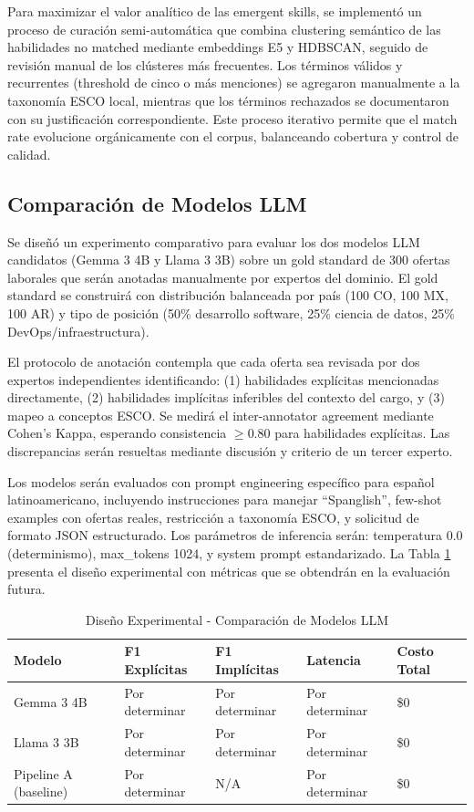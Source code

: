 Para maximizar el valor analítico de las emergent skills, se implementó un proceso de curación semi-automática que combina clustering semántico de las habilidades no matched mediante embeddings E5 y HDBSCAN, seguido de revisión manual de los clústeres más frecuentes. Los términos válidos y recurrentes (threshold de cinco o más menciones) se agregaron manualmente a la taxonomía ESCO local, mientras que los términos rechazados se documentaron con su justificación correspondiente. Este proceso iterativo permite que el match rate evolucione orgánicamente con el corpus, balanceando cobertura y control de calidad.

\subsection{Comparación de Modelos LLM}

Se diseñó un experimento comparativo para evaluar los dos modelos LLM candidatos (Gemma 3 4B y Llama 3 3B) sobre un gold standard de 300 ofertas laborales que serán anotadas manualmente por expertos del dominio. El gold standard se construirá con distribución balanceada por país (100 CO, 100 MX, 100 AR) y tipo de posición (50\% desarrollo software, 25\% ciencia de datos, 25\% DevOps/infraestructura).

El protocolo de anotación contempla que cada oferta sea revisada por dos expertos independientes identificando: (1) habilidades explícitas mencionadas directamente, (2) habilidades implícitas inferibles del contexto del cargo, y (3) mapeo a conceptos ESCO. Se medirá el inter-annotator agreement mediante Cohen's Kappa, esperando consistencia $\geq$0.80 para habilidades explícitas. Las discrepancias serán resueltas mediante discusión y criterio de un tercer experto.

Los modelos serán evaluados con prompt engineering específico para español latinoamericano, incluyendo instrucciones para manejar ``Spanglish'', few-shot examples con ofertas reales, restricción a taxonomía ESCO, y solicitud de formato JSON estructurado. Los parámetros de inferencia serán: temperatura 0.0 (determinismo), max\_tokens 1024, y system prompt estandarizado. La Tabla \ref{tab:llm-comparison-results} presenta el diseño experimental con métricas que se obtendrán en la evaluación futura.

\begin{table}[H]
\centering
\caption{Diseño Experimental - Comparación de Modelos LLM}
\label{tab:llm-comparison-results}
\begin{tabular}{|p{3.5cm}|p{2.5cm}|p{2.5cm}|p{2cm}|p{2cm}|}
\hline
\textbf{Modelo} & \textbf{F1 Explícitas} & \textbf{F1 Implícitas} & \textbf{Latencia} & \textbf{Costo Total} \\
\hline
Gemma 3 4B & Por determinar & Por determinar & Por determinar & \$0 \\
\hline
Llama 3 3B & Por determinar & Por determinar & Por determinar & \$0 \\
\hline
Pipeline A (baseline) & Por determinar & N/A & Por determinar & \$0 \\
\hline
\end{tabular}
\end{table}


